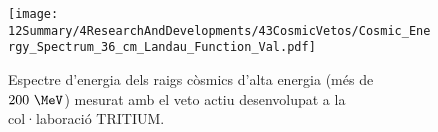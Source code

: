 \begin{enumerate}
\begin{figure}[h]
\texttt{[image: 12Summary/4ResearchAndDevelopments/43CosmicVetos/Cosmic\_Energy\_Spectrum\_36\_cm\_Landau\_Function\_Val.pdf]}
\centering
\caption{Espectre d'energia dels raigs còsmics d'alta energia (més de $200~\MeV$) mesurat amb el veto actiu desenvolupat a la col·laboració TRITIUM\label{fig:EspectreEnergeticVetoActiu}.}
\end{figure}

\end{enumerate} 